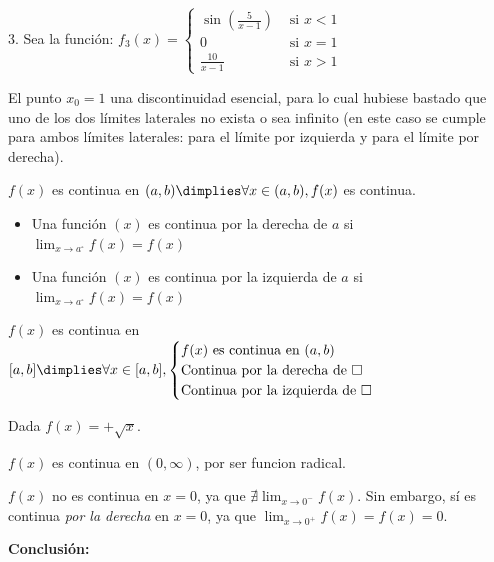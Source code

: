 \begin{example}
3. Sea la función: $f_3(x)=\left\{\begin{matrix}\sin\left(\frac{5}{x-1}\right) & \mbox{ si } x<1 \\ 0 & \mbox{ si } x=1 \\ \frac{10}{x-1}& \mbox{ si } x>1\end{matrix}\right.$

El punto $x_0=1$  una discontinuidad esencial, para lo cual hubiese bastado que uno de los dos límites laterales no exista o sea infinito (en este caso se cumple para ambos límites laterales: para el límite por izquierda y para el límite por derecha).
\end{example}

\begin{defn}

	$f(x)$ es continua en $(a,b) \dimplies \forall x\in(a,b), f(x)$ es continua.
\end{defn}


\begin{defn}
	\begin{itemize}
		\item Una función $(x)$ es continua por la derecha de $a$ si $\displaystyle\lim_{x\to a^\square}f(x) = f(x)$
		\item Una función $(x)$ es continua por la izquierda de $a$ si $\displaystyle\lim_{x\to a^\square} f(x) = f(x)$
	\end{itemize}
\end{defn}

\begin{defn}

$f(x)$ es continua en $[a,b] \dimplies \forall x\in[a,b],\begin{cases} f(x) \text{ es continua en } (a,b)\\
\text{Continua por la derecha de } \square\\
\text{Continua por la izquierda de } \square\\\end{cases}$
\end{defn}
\vspace{-0.5cm}

\begin{example}
Dada $f(x) = +\sqrt{x}$.

$f(x)$ es continua en $(0,\infty)$, por ser funcion radical. 

$f(x)$ no es continua en $x=0$, ya que $\nexists\displaystyle\lim_{x\to 0^-}f(x)$. 
%
Sin embargo, sí es continua \textit{por la derecha} en $x=0$, ya que $\displaystyle\lim_{x\to 0^+} f(x) = f(x) = 0$. 

\textbf{Conclusión:}
\end{example}

